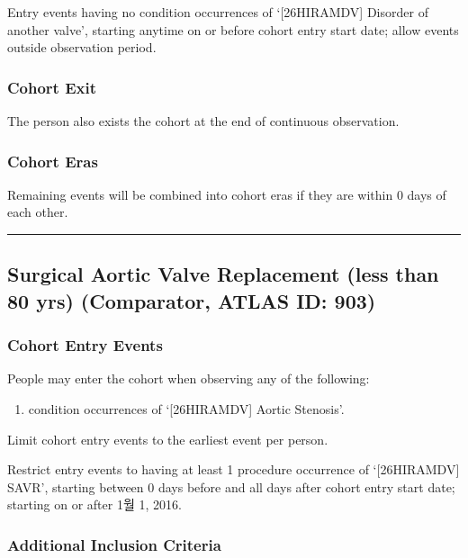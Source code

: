\documentclass[
  12pt,
]{article}
\providecommand{\tightlist}{%
  \setlength{\itemsep}{0pt}\setlength{\parskip}{0pt}}
\begin{document}
Entry events having no condition occurrences of `{[}26HIRAMDV{]}
Disorder of another valve', starting anytime on or before cohort entry
start date; allow events outside observation period.

\subsubsection{Cohort Exit}\label{cohort-exit-2}

The person also exists the cohort at the end of continuous observation.

\subsubsection{Cohort Eras}\label{cohort-eras-2}

Remaining events will be combined into cohort eras if they are within 0
days of each other.

\begin{center}\rule{0.5\linewidth}{0.5pt}\end{center}

\subsection{Surgical Aortic Valve Replacement (less than 80 yrs)
(Comparator, ATLAS ID:
903)}\label{surgical-aortic-valve-replacement-less-than-80-yrs-comparator-atlas-id-903}

\subsubsection{Cohort Entry Events}\label{cohort-entry-events-3}

People may enter the cohort when observing any of the following:

\begin{enumerate}
\def\labelenumi{\arabic{enumi}.}
\tightlist
\item
  condition occurrences of `{[}26HIRAMDV{]} Aortic Stenosis'.
\end{enumerate}

Limit cohort entry events to the earliest event per person.

Restrict entry events to having at least 1 procedure occurrence of
`{[}26HIRAMDV{]} SAVR', starting between 0 days before and all days
after cohort entry start date; starting on or after 1월 1, 2016.

\subsubsection{Additional Inclusion
Criteria}\label{additional-inclusion-criteria-3}
\end{document}

